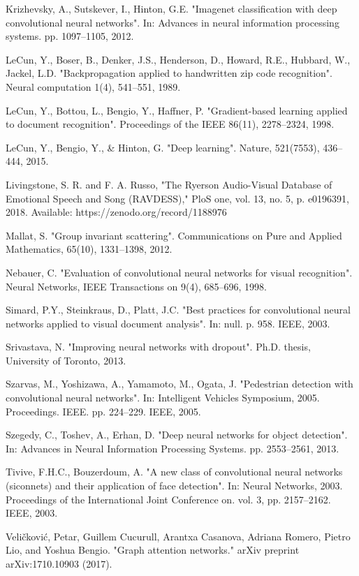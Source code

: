 \documentclass{article}
\begin{document}
\begin{thebibliography}{99}
 Krizhevsky, A., Sutskever, I., Hinton, G.E. "Imagenet classification with deep convolutional neural networks". In: Advances in neural information processing systems. pp. 1097–1105, 2012.

 LeCun, Y., Boser, B., Denker, J.S., Henderson, D., Howard, R.E., Hubbard, W., Jackel, L.D. "Backpropagation applied to handwritten zip code recognition". Neural computation 1(4), 541–551, 1989.

 LeCun, Y., Bottou, L., Bengio, Y., Haffner, P. "Gradient-based learning applied to document recognition". Proceedings of the IEEE 86(11), 2278–2324, 1998.

 LeCun, Y., Bengio, Y., \& Hinton, G. "Deep learning". Nature, 521(7553), 436–444, 2015.

 Livingstone, S. R. and F. A. Russo, "The Ryerson Audio-Visual Database of Emotional Speech and Song (RAVDESS)," PloS one, vol. 13, no. 5, p. e0196391, 2018. Available: https://zenodo.org/record/1188976

 Mallat, S. "Group invariant scattering". Communications on Pure and Applied Mathematics, 65(10), 1331–1398, 2012.

 Nebauer, C. "Evaluation of convolutional neural networks for visual recognition". Neural Networks, IEEE Transactions on 9(4), 685–696, 1998.

 Simard, P.Y., Steinkraus, D., Platt, J.C. "Best practices for convolutional neural networks applied to visual document analysis". In: null. p. 958. IEEE, 2003.

 Srivastava, N. "Improving neural networks with dropout". Ph.D. thesis, University of Toronto, 2013.

 Szarvas, M., Yoshizawa, A., Yamamoto, M., Ogata, J. "Pedestrian detection with convolutional neural networks". In: Intelligent Vehicles Symposium, 2005. Proceedings. IEEE. pp. 224–229. IEEE, 2005.

 Szegedy, C., Toshev, A., Erhan, D. "Deep neural networks for object detection". In: Advances in Neural Information Processing Systems. pp. 2553–2561, 2013.

 Tivive, F.H.C., Bouzerdoum, A. "A new class of convolutional neural networks (siconnets) and their application of face detection". In: Neural Networks, 2003. Proceedings of the International Joint Conference on. vol. 3, pp. 2157–2162. IEEE, 2003.

 Veličković, Petar, Guillem Cucurull, Arantxa Casanova, Adriana Romero, Pietro Lio, and Yoshua Bengio. "Graph attention networks." arXiv preprint arXiv:1710.10903 (2017).


\end{thebibliography}
\end{document}
